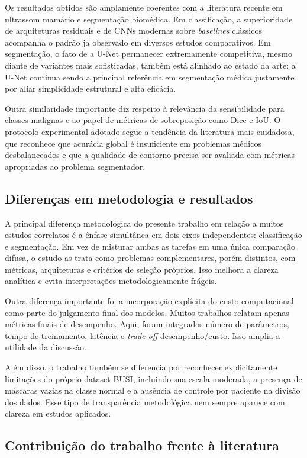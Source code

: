 \documentclass[tcc,capa]{texufpel}
\begin{document}
Os resultados obtidos são amplamente coerentes com a literatura recente em ultrassom mamário e segmentação biomédica. Em classificação, a superioridade de arquiteturas residuais e de CNNs modernas sobre \textit{baselines} clássicos acompanha o padrão já observado em diversos estudos comparativos. Em segmentação, o fato de a U-Net permanecer extremamente competitiva, mesmo diante de variantes mais sofisticadas, também está alinhado ao estado da arte: a U-Net continua sendo a principal referência em segmentação médica justamente por aliar simplicidade estrutural e alta eficácia.

Outra similaridade importante diz respeito à relevância da sensibilidade para classes malignas e ao papel de métricas de sobreposição como Dice e IoU. O protocolo experimental adotado segue a tendência da literatura mais cuidadosa, que reconhece que acurácia global é insuficiente em problemas médicos desbalanceados e que a qualidade de contorno precisa ser avaliada com métricas apropriadas ao problema segmentador.

\subsection{Diferenças em metodologia e resultados}

A principal diferença metodológica do presente trabalho em relação a muitos estudos correlatos é a ênfase simultânea em dois eixos independentes: classificação e segmentação. Em vez de misturar ambas as tarefas em uma única comparação difusa, o estudo as trata como problemas complementares, porém distintos, com métricas, arquiteturas e critérios de seleção próprios. Isso melhora a clareza analítica e evita interpretações metodologicamente frágeis.

Outra diferença importante foi a incorporação explícita do custo computacional como parte do julgamento final dos modelos. Muitos trabalhos relatam apenas métricas finais de desempenho. Aqui, foram integrados número de parâmetros, tempo de treinamento, latência e \textit{trade-off} desempenho/custo. Isso amplia a utilidade da discussão.

Além disso, o trabalho também se diferencia por reconhecer explicitamente limitações do próprio dataset BUSI, incluindo sua escala moderada, a presença de máscaras vazias na classe normal e a ausência de controle por paciente na divisão dos dados. Esse tipo de transparência metodológica nem sempre aparece com clareza em estudos aplicados.

\subsection{Contribuição do trabalho frente à literatura}
\end{document}
